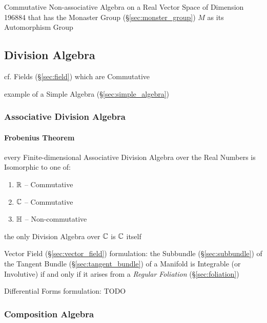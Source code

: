 {{Commutative Non-associative Algebra on a Real Vector Space of Dimension 196884
that has the Monaster Group (\S\ref{sec:monster_group}) $M$ as its Automorphism
Group



\subsection{Division Algebra}\label{sec:division_algebra}

cf. Fields (\S\ref{sec:field}) which are Commutative

example of a Simple Algebra (\S\ref{sec:simple_algebra})



\subsubsection{Associative Division Algebra}
\label{sec:associative_division_algebra}

\paragraph{Frobenius Theorem}\label{sec:frobenius_theorem}\hfill

every Finite-dimensional Associative Division Algebra over the Real Numbers is
Isomorphic to one of:
\begin{enumerate}
  \item $\mathbb{R}$ -- Commutative
  \item $\mathbb{C}$ -- Commutative
  \item $\mathbb{H}$ -- Non-commutative
\end{enumerate}

the only Division Algebra over $\mathbb{C}$ is $\mathbb{C}$ itself

Vector Field (\S\ref{sec:vector_field}) formulation: the Subbundle
(\S\ref{sec:subbundle}) of the Tangent Bundle (\S\ref{sec:tangent_bundle}) of a
Manifold is Integrable (or Involutive) if and only if it arises from a
\emph{Regular Foliation} (\S\ref{sec:foliation})

Differential Forms formulation: TODO



\subsubsection{Composition Algebra}\label{sec:composition_algebra}

}}
